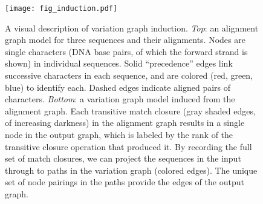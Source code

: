\begin{figure}
   \texttt{[image: fig\_induction.pdf]}
   \caption{
   A visual description of variation graph induction.
   \textit{Top}: an alignment graph model for three sequences and their alignments.
   Nodes are single characters (DNA base pairs, of which the forward strand is shown) in individual sequences.
   Solid ``precedence'' edges link successive characters in each sequence, and are colored (red, green, blue) to identify each.
   Dashed edges indicate aligned pairs of characters.
    \textit{Bottom}: a variation graph model induced from the alignment graph.
   Each transitive match closure (gray shaded edges, of increasing darkness) in the alignment graph results in a single node in the output graph, which is labeled by the rank of the transitive closure operation that produced it.
   By recording the full set of match closures, we can project the sequences in the input through to paths in the variation graph (colored edges).
   The unique set of node pairings in the paths provide the edges of the output graph.
    }
    \label{fig:induction}
\end{figure}
